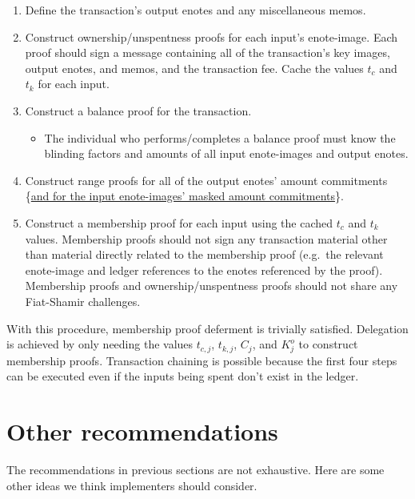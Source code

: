 \begin{enumerate}
    \item Define the transaction's output enotes and any miscellaneous memos.

    \item Construct ownership/unspentness proofs for each input's enote-image. Each proof should sign a message containing all of the transaction's key images, output enotes, and memos, and the transaction fee. Cache the values $t_c$ and $t_k$ for each input.

    \item Construct a balance proof for the transaction.

    \begin{itemize}
        \item The individual who performs/completes a balance proof must know the blinding factors and amounts of all input enote-images and output enotes.
    \end{itemize}

    \item Construct range proofs for all of the output enotes' amount commitments \{\ul{and for the input enote-images' masked amount commitments}\}.

    \item Construct a membership proof for each input using the cached $t_c$ and $t_k$ values. Membership proofs should not sign any transaction material other than material directly related to the membership proof (e.g.\ the relevant enote-image and ledger references to the enotes referenced by the proof). Membership proofs and ownership/unspentness proofs should not share any Fiat-Shamir challenges.
\end{enumerate}

With this procedure, membership proof deferment is trivially satisfied. Delegation is achieved by only needing the values $t_{c,j}$, $t_{k,j}$, $C_j$, and $K^o_j$ to construct membership proofs. Transaction chaining is possible because the first four steps can be executed even if the inputs being spent don't exist in the ledger.



\section{Other recommendations}
\label{sec:other-recommendations}

The recommendations in previous sections are not exhaustive. Here are some other ideas we think implementers should consider.

